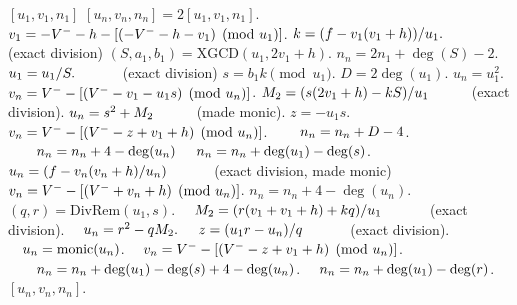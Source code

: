 \begin{algorithm}[htbp]
\caption{Genus 3 Split Model Double (Negative Reduced Balanced NUDUPL)}
\label{alg:g3balnudupl}
\begin{algorithmic}[1]
\Require $[u_1,v_1,n_1]$ 
\Ensure $[u_n,v_n,n_n] = 2[u_1,v_1,n_1]$.
\vspace{5pt}
    \State $v_1 = -V^{-} - h - [(-V^{-} - h - v_1) \pmod{u_1}]$.
\EndIf
\State $k = (f - v_1(v_1 + h))/u_1. \quad\quad\quad$ (exact division)
\State $(S,a_1,b_1) = \mathrm{XGCD}(u_1,2v_1 + h)$.
\State $n_n = 2n_1 + \deg(S) - 2$.
    \State $u_1 = u_1/S. \quad\quad\quad$ (exact division)
\EndIf
\State $s = b_1k \pmod{u_1}$.
\State $D = 2\deg(u_1)$.
    \State $u_n = u_1^2$.
    \State $v_n = V^{-} - [(V^{-} - v_1 - u_1s) \pmod{u_n}]$.
    \State $M_2 = (s(2v_1 + h) - kS)/u_1 \quad\quad\quad $(exact division).
    \State $u_n = s^2 + M_2 \quad\quad\quad$(made monic).
    \State $z = -u_1s$.
    \State $v_n = V^{-} - [(V^{-} - z + v_1 + h) \pmod{u_n}]$.
     $\quad\quad n_n = n_n + D - 4$.
    \Else
         $\quad\quad n_n = n_n + 4 - \deg(u_n)$ 
        \Else \hspace{75pt} $\quad n_n = n_n + \deg(u_1) - \deg(s)$.
        \EndIf
            \State $u_n = (f - v_n(v_n + h)/u_n) \quad\quad\quad$ (exact division, made monic)
            \State $v_n = V^{-} - [(V^{-} + v_n + h) \pmod{u_n}]$.
            \State $n_n = n_n + 4 - \deg(u_n)$.
        \EndIf
    \EndIf
\Else \hspace{2pt} 
    \State $(q,r) = \mathrm{DivRem}(u_1,s)$.
    \State $\quad M_2 = (r(v_1 + v_1 + h) + kq)/u_1 \quad\quad\quad$ (exact division).
    \State $\quad u_n = r^2 - qM_2.$
    \State $\quad z = (u_1r - u_n)/q \quad\quad\quad$ (exact division).
    \State $\quad u_n = \mathrm{monic}(u_n)$.
    \State $\quad v_n = V^{-} - [(V^{-} - z + v_1 + h) \pmod{u_n}]$.
     $\quad\quad n_n = n_n + \deg(u_1) - \deg(s) + 4 - \deg(u_n)$.
    \Else \hspace{74pt} $\quad n_n = n_n + \deg(u_1) - \deg(r)$.
    \EndIf
\EndIf
\State \Return $[u_n,v_n,n_n]$.
\end{algorithmic}
\end{algorithm}
    
